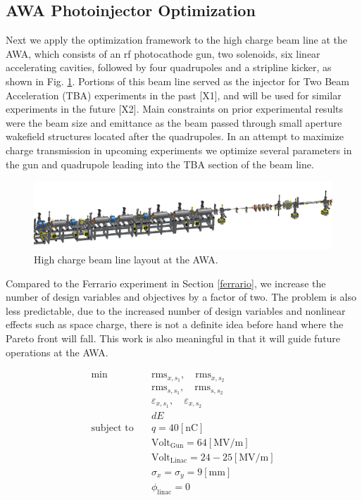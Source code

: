 \subsection{AWA Photoinjector Optimization}
Next we apply the optimization framework to the high charge beam line at the AWA, 
which consists of an rf photocathode gun, two solenoids, six linear accelerating cavities, 
followed by four quadrupoles and a stripline kicker, as shown in Fig. \ref{awa-pic}. 
Portions of this beam line served as the injector for Two Beam 
Acceleration (TBA) experiments in the past [X1], and will be used for 
similar experiments in the future [X2]. Main constraints on prior experimental 
results were the beam size and emittance as the beam passed through small aperture 
wakefield structures located after the quadrupoles. 
In an attempt to maximize charge transmission in upcoming experiments
we optimize several parameters in the gun and quadrupole leading into the 
TBA section of the beam line.

\begin{figure}
	\centering
	\includegraphics[width=0.9\linewidth]{Report/awa-drawing}
	\caption{High charge beam line layout at the AWA.}
	\label{awa-pic}
\end{figure}

\vspace{-1em}
Compared to the Ferrario experiment in Section \ref{ferrario}, 
we increase the number of design variables and objectives by a factor of two.
The problem is also less predictable, due to the increased number of design variables
and nonlinear effects such as space charge, there is not a definite idea
before hand where the Pareto front will fall. This work is also meaningful in that
it will guide future operations at the AWA.

\begin{align}
\text{min}  \quad & \text{rms}_{x, s_1}, \quad \text{rms}_{x, s_2} \label{eq:awa:p1}\\
& \text{rms}_{s, s_1}, \quad \text{rms}_{s, s_2} \label{eq:awa:p2}\\
& \varepsilon_{x,s_1}, \quad \varepsilon_{x,s_2} \label{eq:awa:p3} \\
& dE \label{eq:awa:p4} \\
\text{subject to} \quad & q = 40 \left[\text{nC}\right] \label{eq:awa:firstconstr}\\
\quad & \text{Volt}_{\text{Gun}} = 64\left[\text{MV/m}\right] \label{eq:awa:lastconstr}\\
\quad & \text{Volt}_{\text{Linac}} = 24-25\left[\text{MV/m}\right] \\
\quad & \sigma_x = \sigma_y = 9 \left[\text{mm}\right] \label{eq:awa:firstdvar}\\
\quad & \phi_{\text{linac}} =0 \label{eq:awa:lastdvar}
\end{align}

